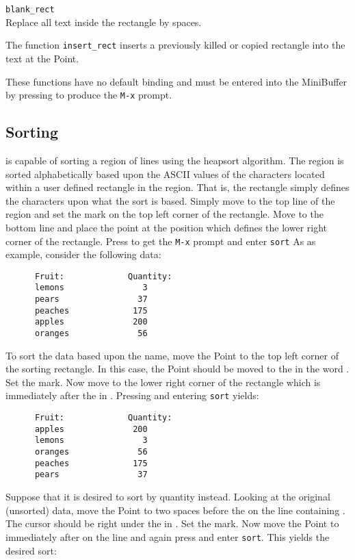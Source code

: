       \verb|blank_rect|\\
         Replace all text inside the rectangle by spaces.


  The function \verb|insert_rect| inserts a previously killed or copied
  rectangle into the text at the Point.

  These functions have no default binding and must be entered into the
  MiniBuffer by pressing  to produce the \verb|M-x| prompt.

\subsection{Sorting}

  \jed{} is capable of sorting a region of lines using the heapsort
  algorithm. The region is sorted alphabetically based upon the ASCII values
  of the characters located within a user defined rectangle in the region.
  That is, the rectangle simply defines the characters upon what the sort is
  based. Simply move to the top line of the region and set the mark on the
  top left corner of the rectangle.  Move to the bottom line and place the
  point at the position which defines the lower right corner of the
  rectangle. Press  to get the \verb|M-x| prompt and enter
  \verb|sort| As as example, consider the following data:

\begin{verbatim}
      Fruit:             Quantity:
      lemons                3
      pears                37
      peaches             175
      apples              200
      oranges              56
\end{verbatim}

  To sort the data based upon the name, move the Point to the top left
  corner of the sorting rectangle.  In this case, the Point should be moved
  to the  in the word .  Set the mark.  Now move to the
  lower right corner of the rectangle which is immediately after the 
  in .  Pressing  and entering \verb|sort| yields:

\begin{verbatim}
      Fruit:             Quantity:
      apples              200
      lemons                3
      oranges              56
      peaches             175
      pears                37
\end{verbatim}

  Suppose that it is desired to sort by quantity instead.  Looking at the
  original (unsorted) data, move the Point to two spaces before the 
  on the line containing .  The cursor should be right under the
   in .  Set the mark.  Now move the Point to immediately after  on
  the  line and again press  and enter \verb|sort|.
  This yields the desired sort:

